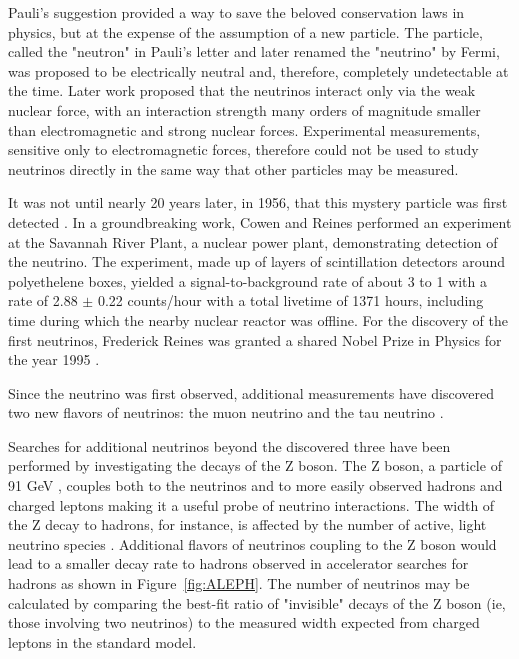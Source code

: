 Pauli's suggestion provided a way to save the beloved conservation laws in physics, but at the expense of the assumption of a new particle.
The particle, called the "neutron" in Pauli's letter and later renamed the "neutrino" by Fermi, was proposed to be electrically neutral and, therefore, completely undetectable at the time.
Later work \cite{Fermi1934} proposed that the neutrinos interact only via the weak nuclear force, with an interaction strength many orders of magnitude smaller than electromagnetic and strong nuclear forces.
Experimental measurements, sensitive only to electromagnetic forces, therefore could not be used to study neutrinos directly in the same way that other particles may be measured.

It was not until nearly 20 years later, in 1956, that this mystery particle was first detected \cite{Cowan-Reines}. 
In a groundbreaking work, Cowen and Reines performed an experiment at the Savannah River Plant, a nuclear power plant, demonstrating detection of the neutrino.
The experiment, made up of layers of scintillation detectors around polyethelene boxes, yielded a signal-to-background rate of about 3 to 1 with a rate of 2.88 $\pm$ 0.22 counts/hour with a total livetime of 1371 hours, including time during which the nearby nuclear reactor was offline.
For the discovery of the first neutrinos, Frederick Reines was granted a shared Nobel Prize in Physics for the year 1995 \cite{NobelPrize:1995-Reines}.

Since the neutrino was first observed, additional measurements have discovered two new flavors of neutrinos: the muon neutrino \cite{Danby-NuMu} and the tau neutrino \cite{DONUT-2001, DONUT-2007}.

Searches for additional neutrinos beyond the discovered three have been performed by investigating the decays of the Z boson. 
The Z boson, a particle of 91 GeV \cite{PDG-2015}, couples both to the neutrinos and to more easily observed hadrons and charged leptons making it a useful probe of neutrino interactions.
The width of the Z decay to hadrons, for instance, is affected by the number of active, light neutrino species \cite{ALEPH-3Nu}.
Additional flavors of neutrinos coupling to the Z boson would lead to a smaller decay rate to hadrons observed in accelerator searches for hadrons as shown in Figure~\ref{fig:ALEPH}.
The number of neutrinos may be calculated by comparing the best-fit ratio of "invisible" decays of the Z boson (ie, those involving two neutrinos) to the measured width expected from charged leptons in the standard model.

